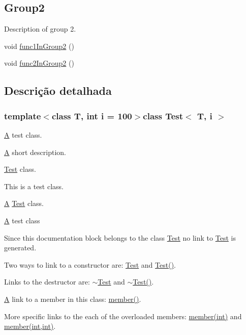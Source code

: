 \subsection*{Group2}
\label{_amgrp6be2faefeff8740e94471f5ae04da6d0}%
Description of group 2. \begin{DoxyCompactItemize}
\item 
void \hyperlink{class_test_a830fbb771817008ac58a211d63b4149a}{func1\-In\-Group2} ()
\item 
void \hyperlink{class_test_ac8edb233ae7671a1c0280604440f482e}{func2\-In\-Group2} ()
\end{DoxyCompactItemize}


\subsection{Descrição detalhada}
\subsubsection*{template$<$class T, int i = 100$>$class Test$<$ T, i $>$}

\hyperlink{class_a}{A} test class. 

\hyperlink{class_a}{A} short description.

\hyperlink{class_test}{Test} class.

This is a test class.

\hyperlink{class_a}{A} \hyperlink{class_test}{Test} class.

\hyperlink{class_a}{A} test class

Since this documentation block belongs to the class \hyperlink{class_test}{Test} no link to \hyperlink{class_test}{Test} is generated.

Two ways to link to a constructor are\-: \hyperlink{class_test}{Test} and \hyperlink{class_test_a350e5417b9f48c2f7b98937514b03da2}{Test()}.

Links to the destructor are\-: \hyperlink{class_test_a6fba67d17f23fe2f810e5f79f4e91538}{$\sim$\-Test} and \hyperlink{class_test_a6fba67d17f23fe2f810e5f79f4e91538}{$\sim$\-Test()}.

\hyperlink{class_a}{A} link to a member in this class\-: \hyperlink{class_test_a596dd7e8230777e2e65779e0da29177b}{member()}.

More specific links to the each of the overloaded members\-: \hyperlink{class_test_a3b57d2ff9a1488b8e434478eb77e7846}{member(int)} and \hyperlink{class_test_afbb46725b4cc672dbf7b52051ec6df8d}{member(int,int)}.

